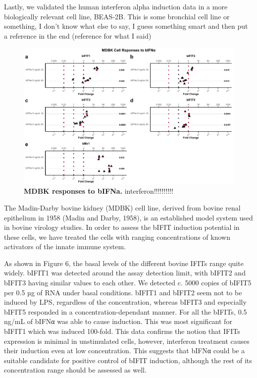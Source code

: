 Lastly, we validated the human interferon alpha induction data in a more biologically relevant cell line, BEAS-2B. This is some bronchial cell line or something, I don't know what else to say, I guess something smart and then put a reference in the end (reference for what I said)

\begin{figure}
    \centering
    \includegraphics[width=1\linewidth]{07. Chapter 2/Figs/02. Induction/01. mdbk_treat_bifna.pdf}
    \caption[MDBK responses to bIFNa.]{\textbf{MDBK responses to bIFNa.} interferon!!!!!!!!!!}
    \label{MDBK responses to bIFNa}
\end{figure}

The Madin-Darby bovine kidney (MDBK) cell line, derived from bovine renal epithelium in 1958 (Madin and Darby, 1958), is an established model system used in bovine virology studies. In order to assess the bIFIT induction potential in these cells, we have treated the cells with ranging concentrations of known activators of the innate immune system.

As shown in Figure 6, the basal levels of the different bovine IFITs range quite widely. bIFIT1 was detected around the assay detection limit, with bIFIT2 and bIFIT3 having similar values to each other. We detected c. 5000 copies of bIFIT5 per 0.5 µg of RNA under basal conditions. bIFIT1 and bIFIT2 seem not to be induced by LPS, regardless of the concentration, whereas bIFIT3 and especially bIFIT5 responded in a concentration-dependant manner. For all the bIFITs, 0.5 ng/mL of bIFNα was able to cause induction. This was most significant for bIFIT1 which was induced 100-fold. This data confirms the notion that IFITs expression is minimal in unstimulated cells, however, interferon treatment causes their induction even at low concentration. This suggests that bIFNα could be a suitable candidate for positive control of bIFIT induction, although the rest of its concentration range should be assessed as well.

